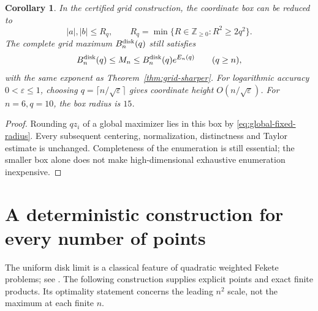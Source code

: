 \documentclass[11pt]{article}
\newtheorem{corollary}[theorem]{Corollary}
\theoremstyle{remark}
\numberwithin{equation}{section}
\begin{document}
\begin{corollary}\label{cor:fixed-disk-grid}
In the certified grid construction, the coordinate box can be reduced to
\[
 |a|,|b|\le R_q,\qquad
 R_q=\min\{R\in\mathbb Z_{\ge0}:R^2\ge2q^2\}.
\]
The complete grid maximum $B_n^{\rm disk}(q)$ still satisfies
\[
 B_n^{\rm disk}(q)\le M_n
 \le B_n^{\rm disk}(q)e^{E_n(q)}\qquad(q\ge n),
\]
with the same exponent as Theorem~\ref{thm:grid-sharper}. For logarithmic
accuracy $0<\varepsilon\le1$, choosing
$q=\lceil n/\sqrt\varepsilon\rceil$ gives coordinate height
$O(n/\sqrt\varepsilon)$. For $n=6,q=10$, the box radius is $15$.
\end{corollary}
\begin{proof}
Rounding $qz_i$ of a global maximizer lies in this box by
\eqref{eq:global-fixed-radius}. Every subsequent centering, normalization,
distinctness and Taylor estimate is unchanged. Completeness of the
enumeration is still essential; the smaller box alone does not make
high-dimensional exhaustive enumeration inexpensive.
\end{proof}

\section{A deterministic construction for every number of points}
\label{general_sec_lattice}
The uniform disk limit is a classical feature of quadratic weighted
Fekete problems; see \cite{AOC,SS}. The following construction supplies
explicit points and exact finite products. Its optimality statement
concerns the leading $n^2$ scale, not the maximum at each finite $n$.
\end{document}
